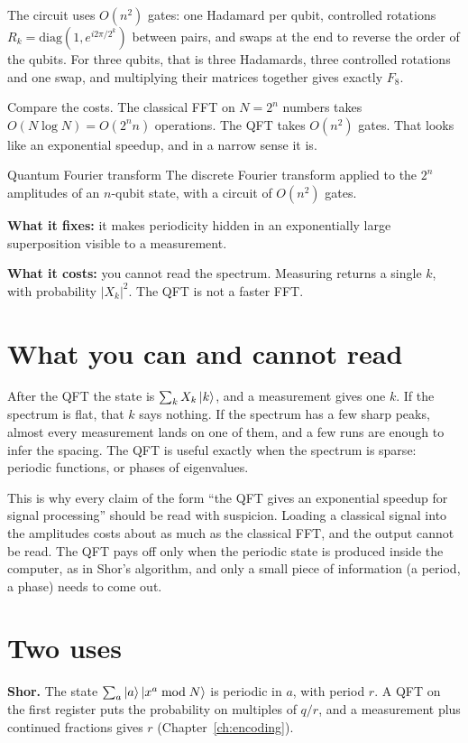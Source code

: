 The circuit uses $O(n^2)$ gates: one Hadamard per qubit, controlled rotations
$R_k = \mathrm{diag}(1, e^{i2\pi/2^k})$ between pairs, and swaps at the end to
reverse the order of the qubits. For three qubits, that is three Hadamards, three
controlled rotations and one swap, and multiplying their matrices together gives
exactly $F_8$.

Compare the costs. The classical FFT on $N = 2^n$ numbers takes $O(N\log N) = O(2^n n)$
operations. The QFT takes $O(n^2)$ gates. That looks like an exponential speedup, and
in a narrow sense it is.

\begin{concept}{Quantum Fourier transform}
The discrete Fourier transform applied to the $2^n$ amplitudes of an $n$-qubit
state, with a circuit of $O(n^2)$ gates.

\textbf{What it fixes:} it makes periodicity hidden in an exponentially large
superposition visible to a measurement.

\textbf{What it costs:} you cannot read the spectrum. Measuring returns a single
$k$, with probability $|X_k|^2$. The QFT is not a faster FFT.
\end{concept}

\section{What you can and cannot read}

After the QFT the state is $\sum_k X_k\ket k$, and a measurement gives one $k$. If
the spectrum is flat, that $k$ says nothing. If the spectrum has a few sharp peaks,
almost every measurement lands on one of them, and a few runs are enough to infer
the spacing. The QFT is useful exactly when the spectrum is sparse: periodic
functions, or phases of eigenvalues.

This is why every claim of the form ``the QFT gives an exponential speedup for
signal processing'' should be read with suspicion. Loading a classical signal into
the amplitudes costs about as much as the classical FFT, and the output cannot be
read. The QFT pays off only when the periodic state is produced inside the
computer, as in Shor's algorithm, and only a small piece of information (a period,
a phase) needs to come out.

\section{Two uses}

\textbf{Shor.} The state $\sum_a \ket a\ket{x^a \bmod N}$ is periodic in $a$, with
period $r$. A QFT on the first register puts the probability on multiples of $q/r$,
and a measurement plus continued fractions gives $r$ (Chapter~\ref{ch:encoding}).

